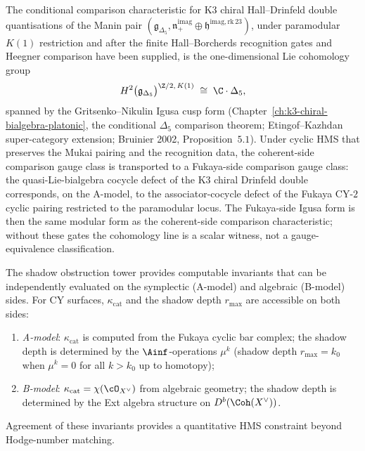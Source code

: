 \begin{remark}
\label{rem:fuk-gauge-class-delta5}
The conditional comparison characteristic for K3 chiral Hall--Drinfeld
double quantisations of the Manin pair $(\mathfrak{g}_{\Delta_5},
\mathfrak{n}_+^{\mathrm{imag}} \oplus
\mathfrak{h}^{\mathrm{imag},\mathrm{rk\,23}})$, under paramodular
$K(1)$ restriction and after the finite Hall--Borcherds recognition
gates and Heegner comparison have been supplied, is the one-dimensional
Lie cohomology group
\[
 H^2\bigl(\mathfrak{g}_{\Delta_5}\bigr)^{\Z/2,\,K(1)}
 \;\cong\; \C \cdot \Delta_5,
\]
spanned by the Gritsenko--Nikulin Igusa cusp form
(Chapter~\ref{ch:k3-chiral-bialgebra-platonic}, the conditional
$\Delta_5$ comparison theorem; Etingof--Kazhdan super-category
extension; Bruinier 2002, Proposition~$5.1$). Under cyclic HMS that
preserves the Mukai pairing and the recognition data, the coherent-side
comparison gauge class is transported to a Fukaya-side comparison gauge
class: the quasi-Lie-bialgebra cocycle defect of the K3 chiral Drinfeld
double corresponds, on the A-model, to the associator-cocycle defect of
the Fukaya CY-$2$ cyclic pairing restricted to the paramodular locus.
The Fukaya-side Igusa form is then the same modular form as the
coherent-side comparison characteristic; without these gates the
cohomology line is a scalar witness, not a gauge-equivalence
classification.
\end{remark}

\begin{remark}
\label{rem:hms-shadow-invariants}
The shadow obstruction tower provides computable invariants that can
be independently evaluated on the symplectic (A-model) and algebraic
(B-model) sides. For CY surfaces, $\kappa_{\mathrm{cat}}$ and the
shadow depth $r_{\max}$ are accessible on both sides:
\begin{enumerate}[label=(\roman*)]
 \item \emph{A-model}: $\kappa_{\mathrm{cat}}$ is computed from the
 Fukaya cyclic bar complex; the shadow depth is determined by the
 $\Ainf$-operations $\mu^k$ (shadow depth $r_{\max} = k_0$ when
 $\mu^k = 0$ for all $k > k_0$ up to homotopy);
 \item \emph{B-model}: $\kappa_{\mathrm{cat}} = \chi(\cO_{X^\vee})$
 from algebraic geometry; the shadow depth is determined by the Ext
 algebra structure on $D^b(\Coh(X^\vee))$.
\end{enumerate}
Agreement of these invariants provides a quantitative HMS constraint
beyond Hodge-number matching.
\end{remark}

